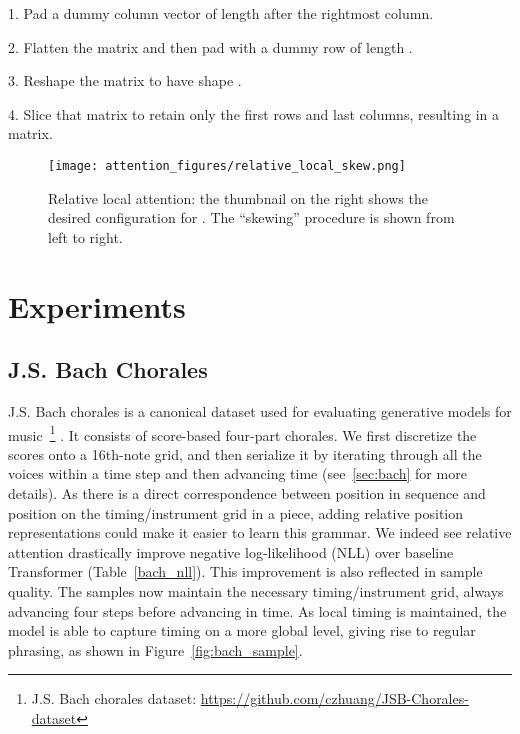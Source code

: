 \documentclass{article} \usepackage{iclr2019_conference,times}
\begin{document}
1. Pad a dummy column vector of length  after the rightmost column. 

2. Flatten the matrix and then pad with a dummy row of length . 


3. Reshape the matrix to have shape .


4. Slice that matrix to retain only the first  rows and last  columns, resulting in a  matrix. 




\begin{figure}[H]
\vskip -0.05in
\begin{center}
\centerline{\texttt{[image: attention\_figures/relative\_local\_skew.png]}}
\caption{Relative local attention: the thumbnail on the right shows the desired configuration for .  The ``skewing'' procedure is shown from left to right.}
\label{fig:rel_local_skew}
\end{center}
\vskip -0.2in
\end{figure}




\section{Experiments} \label{exp}


\subsection{J.S. Bach Chorales}

J.S. Bach chorales is a canonical dataset used for evaluating generative models for music~\footnote{J.S. Bach chorales dataset: \url{https://github.com/czhuang/JSB-Chorales-dataset}} 
\citep[e.g., ][]{allan2005harmonising,boulanger2012modeling,liang2016bachbot,hadjeres2016style,huang2017coconet}.  It consists of score-based four-part chorales.  We first discretize the scores onto a 16th-note grid, and then serialize it by iterating through all the voices within a time step and then advancing time (see~\ref{sec:bach} for more details).  As there is a direct correspondence between position in sequence and position on the  timing/instrument grid in a piece, adding relative position representations could make it easier to learn this grammar. 
We indeed see relative attention drastically improve negative log-likelihood (NLL) over baseline Transformer (Table~\ref{bach_nll}).  
This improvement is also reflected in sample quality.  The samples now maintain the necessary timing/instrument grid, always advancing four steps before advancing in time. 
As local timing is maintained, the model is able to capture timing on a more global level, giving rise to regular phrasing, as shown in Figure~\ref{fig:bach_sample}.
\end{document}
